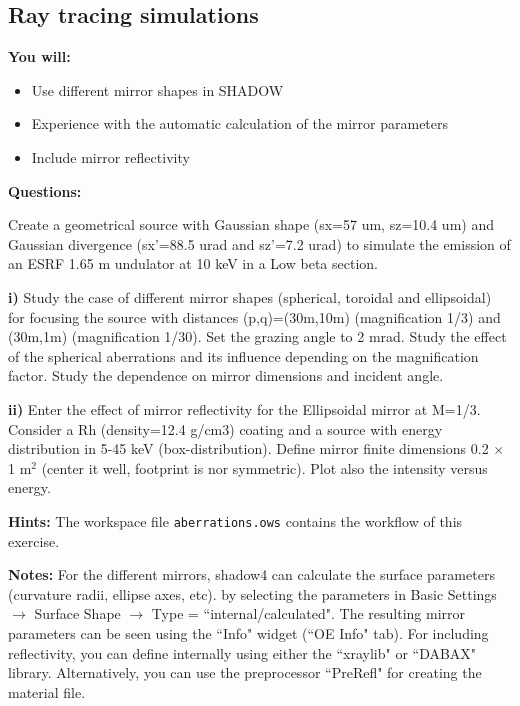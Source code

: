 \subsection{Ray tracing simulations}

\begin{youwillbox}
\textbf{You will:}

\begin{itemize}
    \item Use different mirror shapes in SHADOW
    \item Experience with the automatic calculation of the mirror parameters
    \item Include mirror reflectivity
\end{itemize}
\end{youwillbox}

\begin{questionsbox}
\textbf{Questions:}

Create a geometrical source with Gaussian shape (sx=57 um, sz=10.4 um) and Gaussian divergence (sx'=88.5 urad and sz'=7.2 urad) to simulate the emission of an ESRF 1.65 m undulator at 10 keV in a Low beta section.

\textbf{i)} Study the case of different mirror shapes (spherical, toroidal and ellipsoidal) for focusing the source with distances (p,q)=(30m,10m) (magnification 1/3) and (30m,1m) (magnification 1/30). Set the grazing angle to 2 mrad. Study the effect of the spherical aberrations and its influence depending on the magnification factor.
Study the dependence on mirror dimensions and incident angle.

\textbf{ii)} Enter the effect of mirror reflectivity for the Ellipsoidal mirror at M=1/3. Consider a Rh (density=12.4 g/cm3) coating and a source with energy distribution in 5-45 keV (box-distribution).
Define mirror finite dimensions 0.2 $\times$ 1 m$^2$ (center it well, footprint is nor symmetric).
Plot also the intensity versus energy.
\end{questionsbox}

\begin{hintsbox}
\textbf{Hints:}
The workspace file {\tt aberrations.ows} contains the workflow of this exercise.

\textbf{Notes:}
For the different mirrors, shadow4 can calculate the surface parameters (curvature radii, ellipse axes, etc). by selecting the parameters in Basic Settings $\to$ Surface Shape $\to$ Type = ``internal/calculated". The resulting mirror parameters can be seen using the ``Info" widget (``OE Info" tab). For including reflectivity, you can define internally using either the ``xraylib" or ``DABAX" library. Alternatively, you can use the preprocessor ``PreRefl" for creating the material file.
\end{hintsbox}

